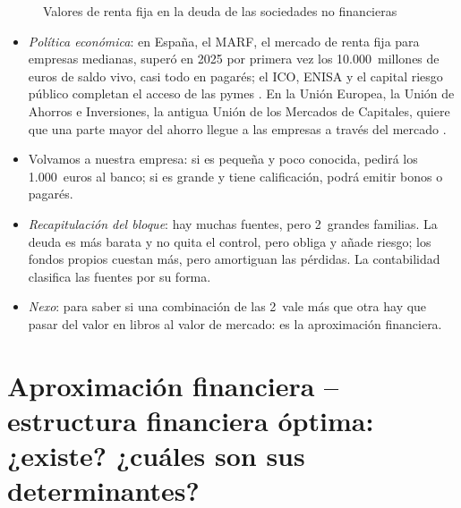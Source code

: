 \documentclass[11pt]{article}
\begin{document}
\begin{figure}[H]
\centering
\caption{Valores de renta fija en la deuda de las sociedades no financieras}\label{fig:deuda-mercado-snf}
\end{figure}

\begin{itemize}
\item \emph{Política económica}: en España, el MARF, el mercado de renta fija para empresas medianas, superó en 2025 por primera vez los 10.000~millones de euros de saldo vivo, casi todo en pagarés\nocite{BME2026InformeMercado}; el ICO, ENISA y el capital riesgo público completan el acceso de las pymes . En la Unión Europea, la Unión de Ahorros e Inversiones, la antigua Unión de los Mercados de Capitales, quiere que una parte mayor del ahorro llegue a las empresas a través del mercado\nocite{CE2025UAI} .
\item Volvamos a nuestra empresa: si es pequeña y poco conocida, pedirá los 1.000~euros al banco; si es grande y tiene calificación, podrá emitir bonos o pagarés.
\item \emph{Recapitulación del bloque}: hay muchas fuentes, pero 2~grandes familias. La deuda es más barata y no quita el control, pero obliga y añade riesgo; los fondos propios cuestan más, pero amortiguan las pérdidas. La contabilidad clasifica las fuentes por su forma.
\item \emph{Nexo}: para saber si una combinación de las 2~vale más que otra hay que pasar del valor en libros al valor de mercado: es la aproximación financiera.
\end{itemize}

\section{Aproximación financiera – estructura financiera óptima:\newline ¿existe? ¿cuáles son sus determinantes?}\label{sec:estructura}
\end{document}
